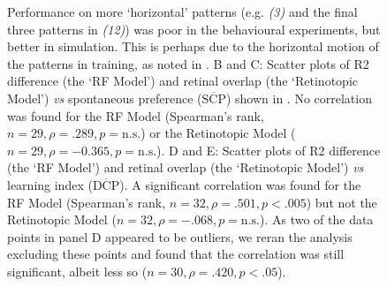 \begin{figure}[htp]
{Performance on more `horizontal' patterns (e.g. \emph{(3)} and the final three patterns in \emph{(12)}) was poor in the behavioural experiments, but better in simulation.
This is perhaps due to the horizontal motion of the patterns in training, as noted in \protect{}.
B and C: Scatter plots of R2 difference (the `RF Model') and retinal overlap (the `Retinotopic Model') \emph{vs} spontaneous preference ($\overline{\mathrm{SCP}}$) shown in \protect{}.
No correlation was found for the RF Model (Spearman's rank, $n=29, \rho=.289, p=\mathrm{n.s.}$) or the Retinotopic Model ($n=29, \rho= -0.365, p=\mathrm{n.s.}$).
D and E: Scatter plots of R2 difference (the `RF Model') and retinal overlap (the `Retinotopic Model') \emph{vs} learning index ($\overline{\mathrm{DCP}}$).
A significant correlation was found for the RF Model (Spearman's rank, $n=32, \rho=.501, p < .005$) but not the Retinotopic Model ($n=32, \rho=-.068,p=\mathrm{n.s.}$).
As two of the data points in panel D appeared to be outliers, we reran the analysis excluding these points and found that the correlation was still significant, albeit less so ($n=30, \rho=.420, p < .05$).}
\label{fig:pattern}
\end{figure}

